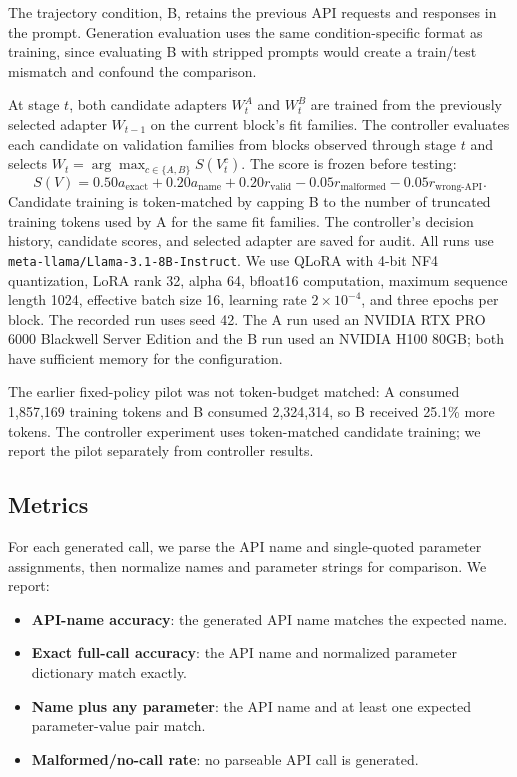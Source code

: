 \documentclass{article}
\begin{document}
The trajectory condition, B, retains the previous API requests and responses in the prompt. Generation evaluation uses the same condition-specific format as training, since evaluating B with stripped prompts would create a train/test mismatch and confound the comparison.

At stage $t$, both candidate adapters $W_t^A$ and $W_t^B$ are trained from the previously selected adapter $W_{t-1}$ on the current block's fit families. The controller evaluates each candidate on validation families from blocks observed through stage $t$ and selects $W_t=\arg\max_{c\in\{A,B\}}S(V_t^c)$. The score is frozen before testing:
\[
S(V)=0.50a_{\mathrm{exact}}+0.20a_{\mathrm{name}}+0.20r_{\mathrm{valid}}-0.05r_{\mathrm{malformed}}-0.05r_{\mathrm{wrong\mbox{-}API}}.
\]
Candidate training is token-matched by capping B to the number of truncated training tokens used by A for the same fit families. The controller's decision history, candidate scores, and selected adapter are saved for audit.
All runs use \texttt{meta-llama/Llama-3.1-8B-Instruct}. We use QLoRA with 4-bit NF4 quantization, LoRA rank 32, alpha 64, bfloat16 computation, maximum sequence length 1024, effective batch size 16, learning rate $2 \times 10^{-4}$, and three epochs per block. The recorded run uses seed 42. The A run used an NVIDIA RTX PRO 6000 Blackwell Server Edition and the B run used an NVIDIA H100 80GB; both have sufficient memory for the configuration.

The earlier fixed-policy pilot was not token-budget matched: A consumed 1,857,169 training tokens and B consumed 2,324,314, so B received 25.1\% more tokens. The controller experiment uses token-matched candidate training; we report the pilot separately from controller results.

\subsection{Metrics}

For each generated call, we parse the API name and single-quoted parameter assignments, then normalize names and parameter strings for comparison. We report:

\begin{itemize}[leftmargin=*]
    \item \textbf{API-name accuracy}: the generated API name matches the expected name.
    \item \textbf{Exact full-call accuracy}: the API name and normalized parameter dictionary match exactly.
    \item \textbf{Name plus any parameter}: the API name and at least one expected parameter-value pair match.
    \item \textbf{Malformed/no-call rate}: no parseable API call is generated.
\end{itemize}
\end{document}
